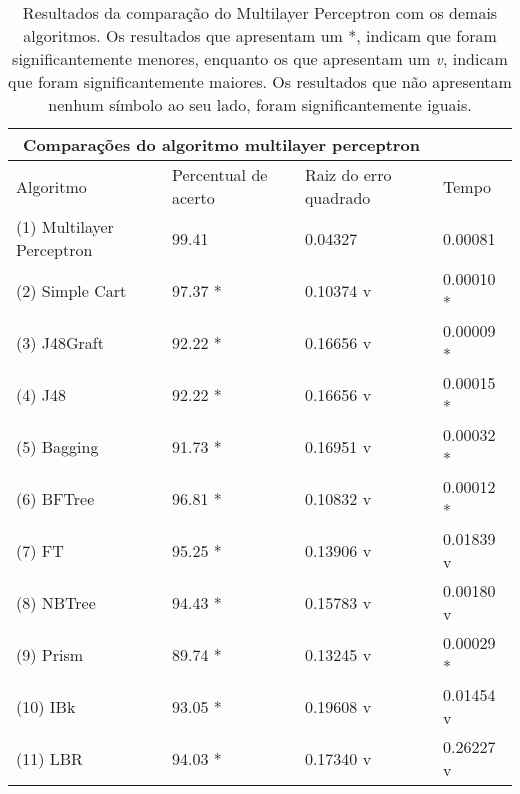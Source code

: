 \begin{table}
  \begin{center}
    \begin{tabular}{ l | l  l  l}
      \hline
      \multicolumn{3}{c}{\bfseries Comparações do algoritmo multilayer perceptron } \\ \hline
      Algoritmo & Percentual de acerto & Raiz do erro quadrado &Tempo \\ \hline
       (1) Multilayer Perceptron & 99.41 & 0.04327 & 0.00081  \\
       (2) Simple Cart & 97.37 * & 0.10374 v & 0.00010 * \\
       (3) J48Graft & 92.22 * & 0.16656 v &0.00009 * \\
       (4) J48 & 92.22 * & 0.16656 v &0.00015 *\\
      (5) Bagging & 91.73 * & 0.16951 v & 0.00032 *  \\
      (6) BFTree  & 96.81 * & 0.10832 v & 0.00012 * \\
      (7) FT  & 95.25 * & 0.13906 v& 0.01839 v \\
      (8) NBTree & 94.43 * & 0.15783 v & 0.00180 v\\
      (9) Prism  & 89.74 * & 0.13245 v & 0.00029 * \\
      (10) IBk  & 93.05 * & 0.19608 v & 0.01454 v \\
      (11) LBR  & 94.03 * & 0.17340 v & 0.26227 v\\ \hline
    \end{tabular}
  \end{center}
\caption{Resultados da comparação do Multilayer Perceptron com os demais algoritmos.
  Os resultados que apresentam um *, indicam que foram significantemente menores,
  enquanto os que apresentam um \emph{v}, indicam que foram significantemente maiores.
  Os resultados que não apresentam nenhum símbolo ao seu lado, foram significantemente
  iguais.}
\label{table:results}
\end{table}
